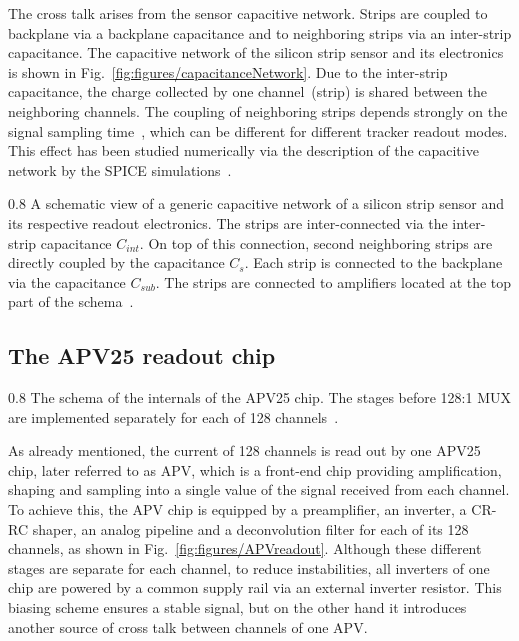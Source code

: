 The cross talk arises from the sensor capacitive network. Strips are coupled to backplane via a backplane capacitance and to neighboring strips via an inter-strip capacitance. The capacitive network of the silicon strip sensor and its electronics is shown in Fig.~\ref{fig:figures/capacitanceNetwork}. Due to the inter-strip capacitance, the charge collected by one channel~(strip) is shared between the neighboring channels. The coupling of neighboring strips depends strongly on the signal sampling time~\cite{Bloch:2007zza}, which can be different for different tracker readout modes. This effect has been studied numerically via the description of the capacitive network by the SPICE simulations~\cite{Barberis:1993ph}.


                 {0.8}       %
                 {A schematic view of a generic capacitive network of a silicon strip sensor and its respective readout electronics. The strips are inter-connected via the inter-strip capacitance $C_{int}$. On top of this connection, second neighboring strips are directly coupled by the capacitance $C_{s}$. Each strip is connected to the backplane via the capacitance $C_{sub}$. The strips are connected to amplifiers located at the top part of the schema~\cite{Lutz:1987wd}.}




\subsection{The APV25 readout chip \label{sec:APV}}


                 {0.8}       %
                 {The schema of the internals of the APV25 chip. The stages before 128:1 MUX are implemented separately for each of 128 channels~\cite{Friedl:2001kra}. } %

As already mentioned, the current of 128 channels is read out by one APV25~\cite{French:2001xb} chip, later referred to as APV, which is a front-end chip providing amplification, shaping and sampling into a single value of the signal received from each channel. To achieve this, the APV chip is equipped by a preamplifier, an inverter, a CR-RC shaper, an analog pipeline and a deconvolution filter for each of its 128 channels, as shown in Fig.~\ref{fig:figures/APVreadout}. Although these different stages are separate for each channel, to reduce instabilities, all inverters of one chip are powered by a common supply rail via an external inverter resistor. This biasing scheme ensures a stable signal, but on the other hand it introduces another source of cross talk between channels of one APV.

